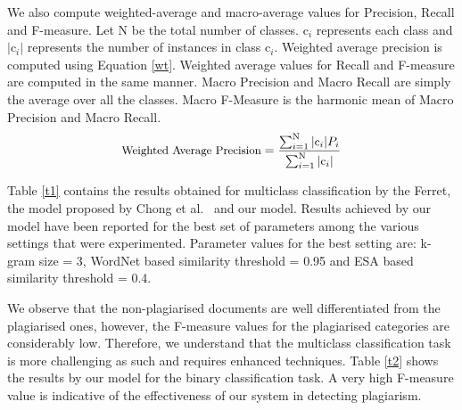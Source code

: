 \documentclass[11pt]{article}
\begin{document}
We also compute weighted-average and macro-average values for Precision, Recall and F-measure. Let N be the total number of classes. $\text{c}_{i}$ represents each class and $|\text{c}_{i}|$ represents the number of instances in class $\text{c}_{i}$. Weighted average precision is computed using Equation  \ref{wt}. Weighted average values for Recall and F-measure are computed in the same manner. 
Macro Precision and Macro Recall are simply the average over all the classes. Macro F-Measure is the harmonic mean of Macro Precision and Macro Recall.
\begin{equation}\label{wt}
\small
\text{Weighted Average Precision} = \frac{\sum_{i=1}^{\text{N}}|\text{c}_{i}|P_{i}}{\sum_{i=1}^{\text{N}}|\text{c}_{i}|}
\end{equation}  


Table \ref{t1} contains the results obtained for multiclass classification by the Ferret, the model proposed by Chong et al.~ and our model. Results achieved by our model have been reported for the best set of parameters among the various settings that were experimented. Parameter values for the best setting are: k-gram size = 3, WordNet based similarity threshold =  0.95 and ESA based similarity threshold = 0.4.

We observe that the non-plagiarised documents are well differentiated from the plagiarised
ones, however, the F-measure values for the plagiarised categories are considerably low. Therefore, we understand that the multiclass classification task is more challenging  as such and requires enhanced techniques. Table \ref{t2} shows the results by our model for the binary classification task. A very high F-measure value is indicative of the effectiveness of our system in detecting plagiarism.
\end{document}
